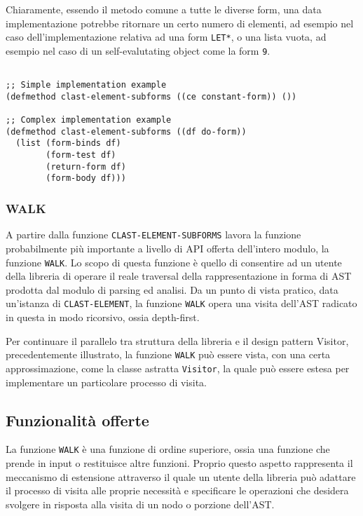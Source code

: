 Chiaramente, essendo il metodo comune a tutte le diverse form, una data
implementazione potrebbe ritornare un certo numero di elementi, ad esempio nel
caso dell'implementazione relativa ad una form \texttt{LET*}, o una lista vuota,
ad esempio nel caso di un self-evalutating object come la form \texttt{9}.

\begin{lstlisting}[caption=Esempi di implementazione del metodo
\texttt{CLAST-ELEMENT-SUBFORMS}]

;; Simple implementation example
(defmethod clast-element-subforms ((ce constant-form)) ())

;; Complex implementation example
(defmethod clast-element-subforms ((df do-form))
  (list (form-binds df)
        (form-test df)
        (return-form df)
        (form-body df)))

\end{lstlisting}

\subsubsection{WALK}
\label{walk}

A partire dalla funzione \texttt{CLAST-ELEMENT-SUBFORMS} lavora la funzione
probabilmente più importante a livello di API offerta dell'intero modulo, la
funzione \texttt{WALK}. Lo scopo di questa funzione è quello di consentire ad un
utente della libreria di operare il reale traversal della rappresentazione in
forma di AST prodotta dal modulo di parsing ed analisi. Da un punto di vista
pratico, data un'istanza di \texttt{CLAST-ELEMENT}, la funzione \texttt{WALK}
opera una visita dell'AST radicato in questa in modo ricorsivo, ossia
depth-first.

Per continuare il parallelo tra struttura della libreria e il design pattern
Visitor, precedentemente illustrato, la funzione \texttt{WALK} può essere vista,
con una certa approssimazione, come la classe astratta \texttt{Visitor}, la
quale può essere estesa per implementare un particolare processo di visita.\\

\subsection{Funzionalità offerte}

La funzione \texttt{WALK} è una funzione di ordine superiore, ossia una funzione
che prende in input o restituisce altre funzioni. Proprio questo aspetto
rappresenta il meccanismo di estensione attraverso il quale un utente della
libreria può adattare il processo di visita alle proprie necessità e specificare
le operazioni che desidera svolgere in risposta alla visita di un nodo o
porzione dell'AST.

